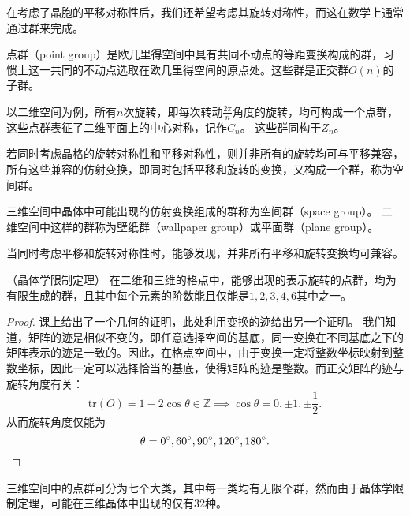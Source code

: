 在考虑了晶胞的平移对称性后，我们还希望考虑其旋转对称性，而这在数学上通常通过群来完成。

\begin{definition}
    点群（point group）是欧几里得空间中具有共同不动点的等距变换构成的群，习惯上这一共同的不动点选取在欧几里得空间的原点处。这些群是正交群$O(n)$的子群。
\end{definition}

以二维空间为例，所有$n$次旋转，即每次转动$\frac{2\pi}{n}$角度的旋转，均可构成一个点群，这些点群表征了二维平面上的中心对称，记作$C_n$。
这些群同构于$Z_n$。

若同时考虑晶格的旋转对称性和平移对称性，则并非所有的旋转均可与平移兼容，所有这些兼容的仿射变换，即同时包括平移和旋转的变换，又构成一个群，称为空间群。

\begin{definition}
    三维空间中晶体中可能出现的仿射变换组成的群称为空间群（space group）。
    二维空间中这样的群称为壁纸群（wallpaper group）或平面群（plane group）。
\end{definition}

当同时考虑平移和旋转对称性时，能够发现，并非所有平移和旋转变换均可兼容。

\begin{theorem}
    （晶体学限制定理）
    在二维和三维的格点中，能够出现的表示旋转的点群，均为有限生成的群，且其中每个元素的阶数能且仅能是$1,2,3,4,6$其中之一。
\end{theorem}

\begin{proof}\small
    课上给出了一个几何的证明，此处利用变换的迹给出另一个证明。
    我们知道，矩阵的迹是相似不变的，即任意选择空间的基底，同一变换在不同基底之下的矩阵表示的迹是一致的。因此，在格点空间中，由于变换一定将整数坐标映射到整数坐标，因此一定可以选择恰当的基底，使得矩阵的迹是整数。而正交矩阵的迹与旋转角度有关：
    \begin{equation}\mathrm{tr}(O) = 1 - 2 \cos \theta \in \mathbb Z \implies \cos \theta = 0, \pm 1, \pm \frac{1}{2}.\end{equation}
    从而旋转角度仅能为
    \begin{equation}\theta = 0^\circ, 60^\circ, 90^\circ, 120^\circ, 180^\circ. \qedhere\end{equation}
\end{proof}

三维空间中的点群可分为七个大类，其中每一类均有无限个群，然而由于晶体学限制定理，可能在三维晶体中出现的仅有32种。

